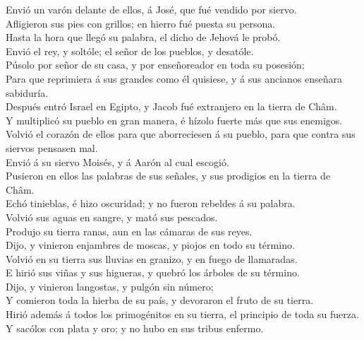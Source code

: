  Envió un varón delante de ellos, á José, que fué vendido
por siervo.\\
 Afligieron sus pies con grillos; en hierro fué puesta su
persona.\\
 Hasta la hora que llegó su palabra, el dicho de Jehová le
probó.\\
 Envió el rey, y soltóle; el señor de los pueblos, y
desatóle.\\
 Púsolo por señor de su casa, y por enseñoreador en toda su
posesión;\\
 Para que reprimiera á sus grandes como él quisiese, y á
sus ancianos enseñara sabiduría.\\
 Después entró Israel en Egipto, y Jacob fué extranjero en
la tierra de Châm.\\
 Y multiplicó su pueblo en gran manera, é hízolo fuerte más
que sus enemigos.\\
 Volvió el corazón de ellos para que aborreciesen á su
pueblo, para que contra sus siervos pensasen mal.\\
 Envió á su siervo Moisés, y á Aarón al cual escogió.\\
 Pusieron en ellos las palabras de sus señales, y sus
prodigios en la tierra de Châm.\\
 Echó tinieblas, é hizo oscuridad; y no fueron rebeldes á
su palabra.\\
 Volvió sus aguas en sangre, y mató sus pescados.\\
 Produjo su tierra ranas, aun en las cámaras de sus
reyes.\\
 Dijo, y vinieron enjambres de moscas, y piojos en todo su
término.\\
 Volvió en su tierra sus lluvias en granizo, y en fuego de
llamaradas.\\
 E hirió sus viñas y sus higueras, y quebró los árboles de
su término.\\
 Dijo, y vinieron langostas, y pulgón sin número;\\
 Y comieron toda la hierba de su país, y devoraron el fruto
de su tierra.\\
 Hirió además á todos los primogénitos en su tierra, el
principio de toda su fuerza.\\
 Y sacólos con plata y oro; y no hubo en sus tribus
enfermo.\\
